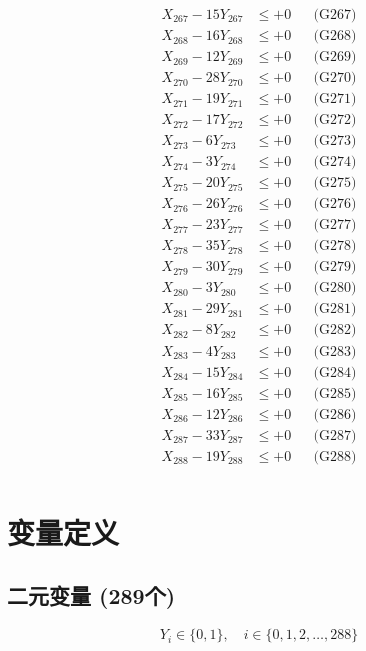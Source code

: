 \documentclass[a4paper,10pt]{article}
\begin{document}
{\begin{align}
X_{267} - 15Y_{267} &\leq +0 && \text{(G267)} \\
X_{268} - 16Y_{268} &\leq +0 && \text{(G268)} \\
X_{269} - 12Y_{269} &\leq +0 && \text{(G269)} \\
X_{270} - 28Y_{270} &\leq +0 && \text{(G270)} \\
X_{271} - 19Y_{271} &\leq +0 && \text{(G271)} \\
X_{272} - 17Y_{272} &\leq +0 && \text{(G272)} \\
X_{273} - 6Y_{273} &\leq +0 && \text{(G273)} \\
X_{274} - 3Y_{274} &\leq +0 && \text{(G274)} \\
X_{275} - 20Y_{275} &\leq +0 && \text{(G275)} \\
\allowbreak
X_{276} - 26Y_{276} &\leq +0 && \text{(G276)} \\
X_{277} - 23Y_{277} &\leq +0 && \text{(G277)} \\
X_{278} - 35Y_{278} &\leq +0 && \text{(G278)} \\
X_{279} - 30Y_{279} &\leq +0 && \text{(G279)} \\
X_{280} - 3Y_{280} &\leq +0 && \text{(G280)} \\
X_{281} - 29Y_{281} &\leq +0 && \text{(G281)} \\
X_{282} - 8Y_{282} &\leq +0 && \text{(G282)} \\
X_{283} - 4Y_{283} &\leq +0 && \text{(G283)} \\
X_{284} - 15Y_{284} &\leq +0 && \text{(G284)} \\
X_{285} - 16Y_{285} &\leq +0 && \text{(G285)} \\
\allowbreak
X_{286} - 12Y_{286} &\leq +0 && \text{(G286)} \\
X_{287} - 33Y_{287} &\leq +0 && \text{(G287)} \\
X_{288} - 19Y_{288} &\leq +0 && \text{(G288)} \\
\end{align}
}

\section{变量定义}

\subsection{二元变量 (289个)}

\begin{equation}
Y_i \in \{0,1\}, \quad i \in \{0, 1, 2, \ldots, 288\}
\end{equation}
\end{document}
